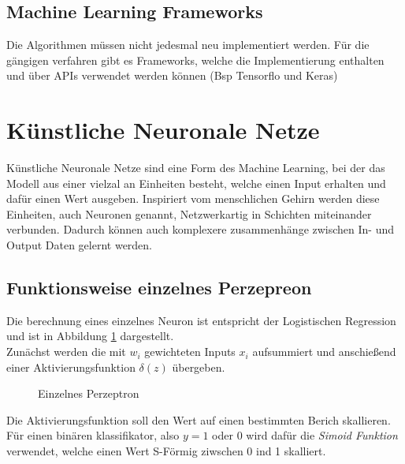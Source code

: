 \subsection{Machine Learning Frameworks}

Die Algorithmen müssen nicht jedesmal neu implementiert werden. 
Für die gängigen verfahren gibt es Frameworks, welche 
die Implementierung enthalten und über APIs verwendet 
werden können (Bsp Tensorflo und Keras)




\section{Künstliche Neuronale Netze} \label{sec:nn}


Künstliche Neuronale Netze sind eine Form des Machine Learning, 
bei der das Modell aus einer vielzal an Einheiten besteht, welche 
einen Input erhalten und dafür einen Wert ausgeben. Inspiriert 
vom menschlichen Gehirn werden diese Einheiten, auch Neuronen genannt, 
Netzwerkartig in Schichten miteinander verbunden. Dadurch können 
auch komplexere zusammenhänge zwischen In- und Output Daten 
gelernt werden.

\subsection{Funktionsweise einzelnes Perzepreon}\label{subsec:percepron}

Die berechnung eines einzelnes Neuron ist entspricht der Logistischen 
Regression und ist in Abbildung \ref{fig:neuron} dargestellt.
\\
Zunächst werden die mit $w_{i}$ gewichteten Inputs $x_{i}$ aufsummiert 
und anschießend einer Aktivierungsfunktion $\delta(z)$ übergeben.

\begin{figure}[htb]
    \centering
    
    \caption{Einzelnes Perzeptron}
    \label{fig:neuron}
\end{figure}

Die Aktivierungsfunktion soll den Wert auf einen bestimmten Berich skallieren.
Für einen binären klassifikator, also $y = 1$ oder $0$ wird dafür die 
\textit{Simoid Funktion} verwendet, welche einen Wert S-Förmig ziwschen 0 ind 1 
skalliert. 

